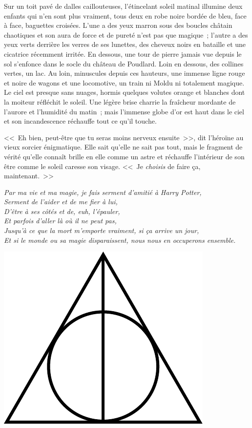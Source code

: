 Sur un toit pavé de dalles caillouteuses, l'étincelant soleil matinal illumine deux enfants qui n'en sont plus vraiment, tous deux en robe noire bordée de bleu, face à face, baguettes croisées. L'une a des yeux marron sous des boucles châtain chaotiques et son aura de force et de pureté n'est pas que magique~; l'autre a des yeux verts derrière les verres de ses lunettes, des cheveux noirs en bataille et une cicatrice récemment irritée. En dessous, une tour de pierre jamais vue depuis le sol s'enfonce dans le socle du château de Poudlard. Loin en dessous, des collines vertes, un lac. Au loin, minuscules depuis ces hauteurs, une immense ligne rouge et noire de wagons et une locomotive, un train ni Moldu ni totalement magique. Le ciel est presque sans nuages, hormis quelques volutes orange et blanches dont la moiteur réfléchit le soleil. Une légère brise charrie la fraîcheur mordante de l'aurore et l'humidité du matin~; mais l'immense globe d'or est haut dans le ciel et son incandescence réchauffe tout ce qu'il touche.

<<~Eh bien, peut-être que tu seras moins nerveux ensuite~>>, dit l'héroïne au vieux sorcier énigmatique. Elle sait qu'elle ne sait pas tout, mais le fragment de vérité qu'elle connaît brille en elle comme un astre et réchauffe l'intérieur de son être comme le soleil caresse son visage. <<~Je \emph{choisis} de faire ça, maintenant.~>>

\emph{Par ma vie et ma magie, je fais serment d'amitié à Harry Potter,\\ Serment de l'aider et de me fier à lui,\\ D'être à ses côtés et de, euh, l'épauler,\\ Et parfois d'aller là où il ne peut pas,\\ Jusqu'à ce que la mort m'emporte vraiment, si ça arrive un jour,\\ Et si le monde ou sa magie disparaissent, nous nous en occuperons ensemble.}
\vspace*{\fill}
{
\begin{center}
\includegraphics[scale=0.75]{Deathly_Hallows_Sign.pdf}
\end{center}
}
\vspace*{\fill}
\clearpage

